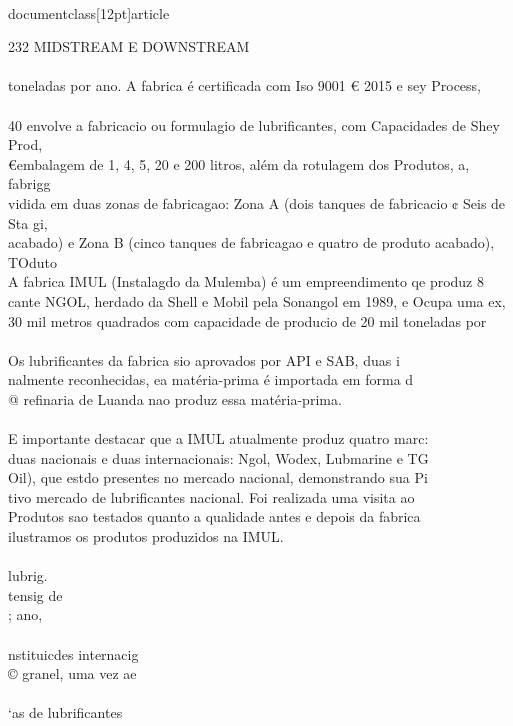\\documentclass[12pt]{article}
\begin{document}
232 MIDSTREAM E DOWNSTREAM\\
\\
toneladas por ano. A fabrica é certificada com Iso 9001 € 2015 e sey Process,\\
\\
40 envolve a fabricacio ou formulagio de lubrificantes, com Capacidades de Shey Prod,\\
€embalagem de 1, 4, 5, 20 e 200 litros, além da rotulagem dos Produtos, a, fabrigg\\
vidida em duas zonas de fabricagao: Zona A (dois tanques de fabricacio ¢ Seis de Sta gi,\\
acabado) e Zona B (cinco tanques de fabricagao e quatro de produto acabado), TOduto\\
A fabrica IMUL (Instalagdo da Mulemba) é um empreendimento qe produz 8\\
cante NGOL, herdado da Shell e Mobil pela Sonangol em 1989, e Ocupa uma ex,\\
30 mil metros quadrados com capacidade de producio de 20 mil toneladas por\\
\\
Os lubrificantes da fabrica sio aprovados por API e SAB, duas i\\
nalmente reconhecidas, ea matéria-prima é importada em forma d\\
@ refinaria de Luanda nao produz essa matéria-prima.\\
\\
E importante destacar que a IMUL atualmente produz quatro marc:\\
duas nacionais e duas internacionais: Ngol, Wodex, Lubmarine e TG\\
Oil), que estdo presentes no mercado nacional, demonstrando sua Pi\\
tivo mercado de lubrificantes nacional. Foi realizada uma visita ao\\
Produtos sao testados quanto a qualidade antes e depois da fabrica\\
ilustramos os produtos produzidos na IMUL.\\
\\
lubrig.\\
tensig de\\
; ano,\\
\\
nstituicdes internacig\\
© granel, uma vez ae\\
\\
‘as de lubrificantes\\
\end{document}
